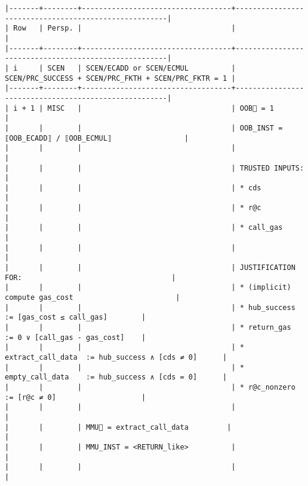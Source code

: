 \documentclass[varwidth=\maxdimen,margin=0.5cm,multi={verbatim}]{standalone}
\begin{document}
\begin{verbatim}
|-------+--------+-----------------------------------+------------------------------------------------------|
| Row   | Persp. |                                   |                                                      |
|-------+--------+-----------------------------------+------------------------------------------------------|
| i     | SCEN   | SCEN/ECADD or SCEN/ECMUL          | SCEN/PRC_SUCCESS + SCEN/PRC_FKTH + SCEN/PRC_FKTR = 1 |
|-------+--------+-----------------------------------+------------------------------------------------------|
| i + 1 | MISC   |                                   | OOB🚩 = 1                                            |
|       |        |                                   | OOB_INST = ⟦OOB_ECADD⟧ / ⟦OOB_ECMUL⟧                 |
|       |        |                                   |                                                      |
|       |        |                                   | TRUSTED INPUTS:                                      |
|       |        |                                   | * cds                                                |
|       |        |                                   | * r@c                                                |
|       |        |                                   | * call_gas                                           |
|       |        |                                   |                                                      |
|       |        |                                   | JUSTIFICATION FOR:                                   |
|       |        |                                   | * (implicit) compute gas_cost                        |
|       |        |                                   | * hub_success        := [gas_cost ≤ call_gas]        |
|       |        |                                   | * return_gas         := 0 ∨ [call_gas - gas_cost]    |
|       |        |                                   | * extract_call_data  := hub_success ∧ [cds ≠ 0]      |
|       |        |                                   | * empty_call_data    := hub_success ∧ [cds = 0]      |
|       |        |                                   | * r@c_nonzero        := [r@c ≠ 0]                    |
|       |        |                                   |                                                      |
|       |        | MMU🚩 = extract_call_data         |                                                      |
|       |        | MMU_INST = <RETURN_like>          |                                                      |
|       |        |                                   |                                                      |

\end{verbatim}
\end{document}
